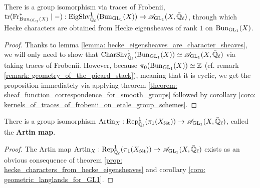         \begin{proposition} \label{prop: hecke_characters_from_hecke_eigensheaves}
            There is a group isomorphism via traces of Frobenii, $\operatorname{tr}(\mathrm{Fr}_{\mathrm{Bun}_{\operatorname{GL}_1}(X)}^* \mid -): \mathrm{Eig}\mathrm{Shv}_{\bar{\mathbb{Q}}_{\ell}}^1(\mathrm{Bun}_{\operatorname{GL}_1}(X)) \to \mathscr{A}_{\operatorname{GL}_1}(X, \bar{\mathbb{Q}}_{\ell})$, through which Hecke characters are obtained from Hecke eigensheaves of rank $1$ on $\mathrm{Bun}_{\operatorname{GL}_1}(X)$.
        \end{proposition}
            \begin{proof}
                Thanks to lemma \ref{lemma: hecke_eigensheaves_are_character_sheaves}, we will only need to show that $\mathrm{Char}\mathrm{Shv}_{\bar{\mathbb{Q}}_{\ell}}^1(\mathrm{Bun}_{\operatorname{GL}_1}(X)) \simeq \mathscr{A}_{\operatorname{GL}_1}(X, \bar{\mathbb{Q}}_{\ell})$ via taking traces of Frobenii. However, because $\pi_0(\mathrm{Bun}_{\operatorname{GL}_1}(X)) \simeq \mathbb{Z}$ (cf. remark \ref{remark: geometry_of_the_picard_stack}), meaning that it is cyclic, we get the proposition immediately via applying theorem \ref{theorem: sheaf_function_correspondence_for_smooth_groups} followed by corollary \ref{coro: kernels_of_traces_of_frobenii_on_etale_group_schemes}.
            \end{proof}
        
        \begin{theorem} \label{theorem: artin_reciprocity_for_function_fields_over_finite_fields}
            \cite[Theorem VI.5.5]{neukirch_2010_algebraic_number_theory} There is a group isomorphism $\mathrm{Artin}_X: \mathrm{Rep}^1_{\bar{\mathbb{Q}}_{\ell}}(\pi_1(X_{\mathrm{f\acute{e}t}})) \to \mathscr{A}_{\operatorname{GL}_1}(X, \bar{\mathbb{Q}}_{\ell})$, called the \textbf{Artin map}.
        \end{theorem}
            \begin{proof}
                The Artin map $\mathrm{Artin}_X: \mathrm{Rep}^1_{\bar{\mathbb{Q}}_{\ell}}(\pi_1(X_{\mathrm{f\acute{e}t}})) \to \mathscr{A}_{\operatorname{GL}_1}(X, \bar{\mathbb{Q}}_{\ell})$ exists as an obvious consequence of theorem \ref{prop: hecke_characters_from_hecke_eigensheaves} and corollary \ref{coro: geometric_langlands_for_GL1}. 
            \end{proof}
            
